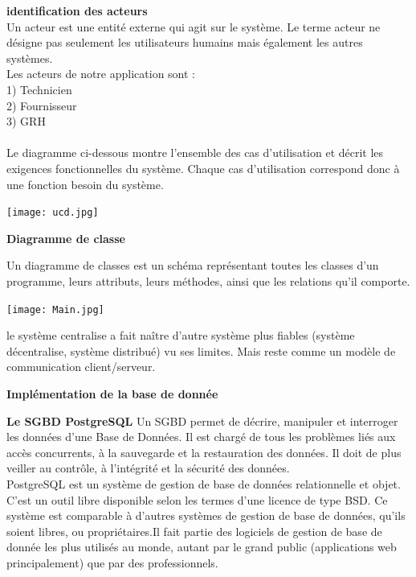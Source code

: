 \documentclass[12pt, openany]{report}
\begin{document}
\textbf{identification des acteurs}\\
Un acteur est une entité externe qui agit sur le système. Le terme acteur ne désigne pas seulement les utilisateurs humains mais également les autres systèmes.\\
Les acteurs de notre application sont :\\
    1) Technicien\\
    2) Fournisseur\\
    3) GRH\\
    \\
    Le diagramme ci-dessous montre l'ensemble des cas d'utilisation et décrit les exigences fonctionnelles du système. Chaque cas d'utilisation correspond donc à une fonction besoin du système.
\newpage
    \begin{center}
\texttt{[image: ucd.jpg]}~\\[1.5cm]
\end{center}
\newpage
\begin{center}
\textbf{Diagramme de classe}\\
\end{center}
Un diagramme de classes est un schéma représentant toutes les classes d’un programme, leurs attributs, leurs méthodes, ainsi que les relations qu’il comporte.
\begin{center}
\texttt{[image: Main.jpg]}~\\[1.5cm]
\end{center}
le système centralise a fait naître d’autre système plus fiables (système décentralise, système distribué) vu ses limites. Mais reste comme un modèle de communication client/serveur.\\
\begin{center}
\textbf{Implémentation de la base de donnée}\\
\end{center}
\textbf{Le SGBD PostgreSQL}
Un SGBD permet de décrire, manipuler et interroger les données d'une Base de Données. Il est chargé de tous les problèmes liés aux accès concurrents, à la sauvegarde et la restauration des données. Il doit de plus veiller au contrôle, à l'intégrité et la sécurité des données.\\
PostgreSQL est un système de gestion de base de données relationnelle et objet. C'est un outil libre disponible selon les termes d'une licence de type BSD. Ce système est comparable à d'autres systèmes de gestion de base de données, qu'ils soient libres, ou propriétaires.Il fait partie des logiciels de gestion de base de donnée les plus utilisés au monde, autant par le grand public (applications web principalement) que par des professionnels. \\
\end{document}
